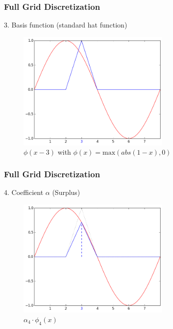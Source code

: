 \begin{frame}
  \frametitle{Full Grid Discretization}
  \topline
  \vspace{-10px}
  \begin{block}{3. Basis function (standard hat function)}
    \begin{figure}[!htp]

      \centering
      \includegraphics[width=7.5cm]{images/singlebasis_3}
      \vspace{-12px}
      \caption{$\phi(x - 3)$ with $\phi(x) = \text{max}(abs(1 - x), 0)$}
    \end{figure}
  \end{block}
\end{frame}

\begin{frame}
  \frametitle{Full Grid Discretization}
  \topline
  \vspace{-10px}
  \begin{block}{4. Coefficient $\alpha$ (Surplus)}
    \begin{figure}[!htp]

      \centering
      \includegraphics[width=7.5cm]{images/singlebasis_4}
      \vspace{-12px}
      \caption{$\alpha_4 \cdot \phi_4(x)$}
    \end{figure}
  \end{block}
\end{frame}

